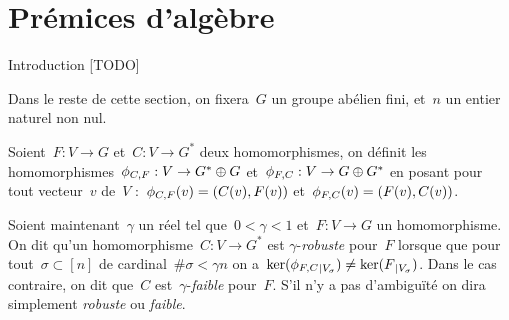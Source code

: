 \section{Prémices d'algèbre}
	Introduction [TODO]
	
	Dans le reste de cette section, on fixera~$G$  un groupe abélien fini, et~$n$ un entier naturel non nul.
	
	Soient~$F: V \rightarrow G$ et~$C : V \rightarrow G^*$ deux homomorphismes, on définit les homomorphismes~$\phi_{C,F} : V \rightarrow G^* \oplus G$ et~$\phi_{F,C} : V \rightarrow G \oplus G^*$ en posant pour tout vecteur~$v$ de~$V$ :~$\phi_{C,F}(v) = (C(v),F(v))$ et~$\phi_{F,C}(v) = (F(v),C(v))$\marginnote{$\phiCF, \phiFC$}.
	
	Soient maintenant~$\gamma$ un réel tel que~$0<\gamma<1$ et~$F : V \rightarrow G$ un homomorphisme. On dit qu'un homomorphisme~$C : V \rightarrow G^*$ est $\gamma$-\emph{robuste} pour~$F$ lorsque que pour tout~$\sigma \subset [n]$ de cardinal~$\#\sigma < \gamma n$ on a~$\ker(\phi_{F,C}{}_{|V_\sigma}) \neq \ker(F{}_{|V_\sigma})$. Dans le cas contraire, on dit que~$C$ est~$\gamma$-\emph{faible} pour~$F$. S'il n'y a pas d'ambiguïté on dira simplement \emph{robuste} ou \emph{faible}.
	
